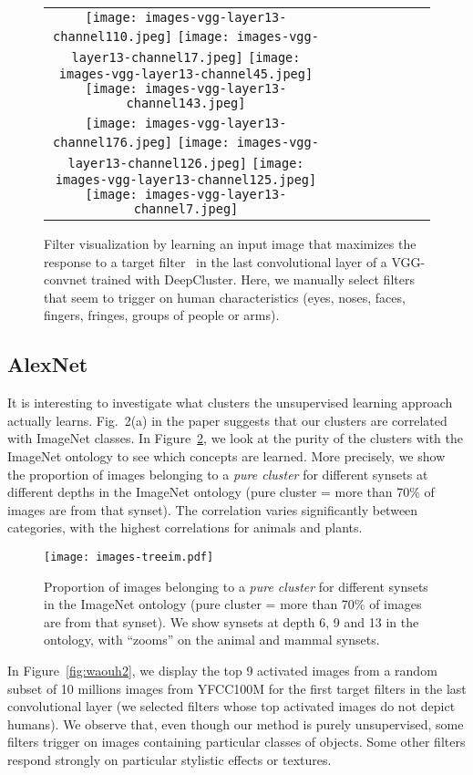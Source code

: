 \documentclass[runningheads]{llncs}
\def\OURS{DeepCluster\xspace}
\begin{document}
\begin{figure}[t]
\centering
\begin{tabular}{cccccccc}
\texttt{[image: images-vgg-layer13-channel110.jpeg]}
\texttt{[image: images-vgg-layer13-channel17.jpeg]}
\texttt{[image: images-vgg-layer13-channel45.jpeg]}
\texttt{[image: images-vgg-layer13-channel143.jpeg]}
\\
\texttt{[image: images-vgg-layer13-channel176.jpeg]}
\texttt{[image: images-vgg-layer13-channel126.jpeg]}
\texttt{[image: images-vgg-layer13-channel125.jpeg]}
\texttt{[image: images-vgg-layer13-channel7.jpeg]}

\end{tabular}
\caption{
    Filter visualization by learning an input image that maximizes the response to a target filter~\cite{yosinski2015understanding} in the last convolutional layer of a VGG- convnet trained with \OURS.
    Here, we manually select filters that seem to trigger on human characteristics (eyes, noses, faces, fingers, fringes, groups of people or arms).
}
\label{fig:human}
\end{figure}




\subsection{AlexNet}
It is interesting to investigate what clusters the unsupervised learning approach actually learns. 
Fig.~2(a) in the paper suggests that our clusters are correlated with ImageNet classes.
In Figure~\ref{fig:clusters}, we look at the purity of the clusters with the ImageNet ontology to see which concepts are learned.
More precisely, we show the proportion of images belonging to a \emph{pure cluster} for different synsets at different depths in the ImageNet ontology (pure cluster = more than 70\% of images are from that synset).
The correlation varies significantly between categories, with the highest correlations for animals and plants.

\begin{figure}[t]
\centering
\texttt{[image: images-treeim.pdf]} \\
\caption{
  {
    \footnotesize
    Proportion of images belonging to a \emph{pure cluster} for different synsets in the ImageNet ontology (pure cluster = more than 70\% of images are from that synset).
    We show synsets at depth 6, 9 and 13 in the ontology, with ``zooms'' on the animal and mammal synsets.
  }
}
\vspace{-1em}
\label{fig:clusters}
\end{figure}
In Figure~\ref{fig:waouh2}, we display the top 9 activated images from a random subset of 10 millions images from YFCC100M for the first  target filters in the last convolutional layer 
(we selected filters whose top activated images do not depict humans).
We observe that, even though our method is purely unsupervised, some filters trigger on images containing particular classes of objects.
Some other filters respond strongly on particular stylistic effects or textures.
\end{document}
